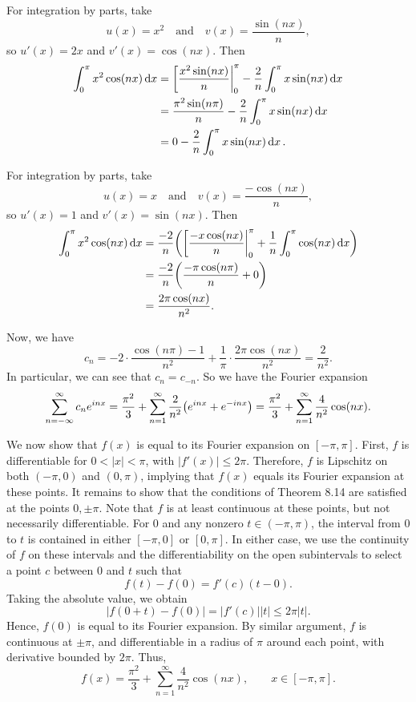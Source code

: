 \documentclass[12pt]{article}
\theoremstyle{definition}
\newcommand{\isp}[1]{\quad\text{#1}\quad}
\begin{document}
For integration by parts, take
\[
    u(x) = x^2 \isp{and} v(x) = \frac{\sin(nx)}{n},
\]
so $u'(x) = 2x$ and $v'(x) = \cos(nx)$. Then
\begin{align*}
    \int_{0}^{\pi} x^2\cos(nx) \dd{x}
        &= \eval[\frac{x^2\sin(nx)}{n}|_{0}^{\pi} - \frac{2}{n} \int_{0}^{\pi} x\sin(nx) \dd{x} \\
        &= \frac{\pi^2\sin(n\pi)}{n} - \frac{2}{n} \int_{0}^{\pi} x\sin(nx) \dd{x} \\ 
        &= 0 - \frac{2}{n} \int_{0}^{\pi} x\sin(nx) \dd{x}.
\end{align*}

For integration by parts, take
\[
    u(x) = x \isp{and} v(x) = \frac{-\cos(nx)}{n},
\]
so $u'(x) = 1$ and $v'(x) = \sin(nx)$. Then
\begin{align*}
    \int_{0}^{\pi} x^2\cos(nx) \dd{x}
        &= \frac{-2}{n} \qty(\eval[\frac{-x\cos(nx)}{n}|_{0}^{\pi} + \frac{1}{n}\int_{0}^{\pi} \cos(nx) \dd{x}) \\
        &= \frac{-2}{n} \qty(\frac{-\pi\cos(n\pi)}{n} + 0) \\
        &= \frac{2\pi\cos(nx)}{n^2}.
\end{align*}

Now, we have
\[
    c_n
        = -2 \cdot \frac{\cos(n\pi) - 1}{n^2} + \frac{1}{\pi} \cdot \frac{2\pi\cos(nx)}{n^2}
        = \frac{2}{n^2}.
\]
In particular, we can see that $c_n = c_{-n}$. So we have the Fourier expansion
\[
    \sum_{n = - \infty}^{\infty} c_n e^{inx} 
        = \frac{\pi^2}{3} + \sum_{n=1}^{\infty}\frac{2}{n^2}\qty(e^{inx} + e^{-inx})
        = \frac{\pi^2}{3} + \sum_{n=1}^{\infty}\frac{4}{n^2}\cos(nx).
\]



We now show that $f(x)$ is equal to its Fourier expansion on $[-\pi, \pi]$. First, $f$ is differentiable for $0 < |x| < \pi$, with $|f'(x)| \leq 2\pi$. Therefore, $f$ is Lipschitz on both $(-\pi, 0)$ and $(0, \pi)$,  implying that $f(x)$ equals its Fourier expansion at these points. It remains to show that the conditions of Theorem 8.14 are satisfied at the points $0, \pm\pi$. Note that $f$ is at least continuous at these points, but not necessarily differentiable. For $0$ and any nonzero $t \in (-\pi, \pi)$, the interval from $0$ to $t$ is contained in either $[-\pi, 0]$ or $[0, \pi]$. In either case, we use the continuity of $f$ on these intervals and the differentiability on the open subintervals to select a point $c$ between $0$ and $t$ such that
\[
    f(t) - f(0) = f'(c)(t - 0).
\]
Taking the absolute value, we obtain
\[
    |f(0 + t) - f(0)| = |f'(c)||t| \leq 2\pi|t|.
\]
Hence, $f(0)$ is equal to its Fourier expansion. By similar argument, $f$ is continuous at $\pm\pi$, and differentiable in a radius of $\pi$ around each point, with derivative bounded by $2\pi$. Thus,
\[
    f(x) = \frac{\pi^2}{3} + \sum_{n=1}^{\infty}\frac{4}{n^2}\cos(nx), \qquad x \in [-\pi, \pi].
\]
\end{document}
